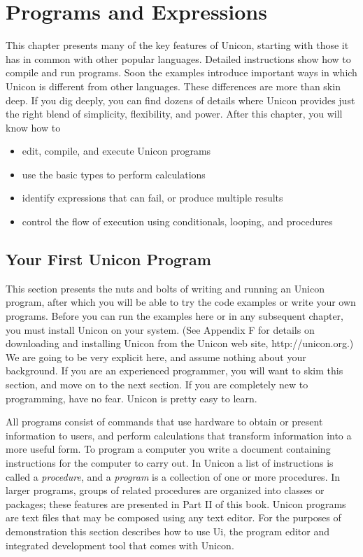 \chapter{Programs and Expressions}

This chapter presents many of the key features of Unicon, starting
with those it has in common with other popular languages. Detailed
instructions show how to compile and run
programs. Soon the examples introduce important ways in which Unicon
is different from other languages. These differences are more than
skin deep. If you dig deeply, you can find dozens of details where
Unicon provides just the right blend of simplicity, flexibility, and
power.  After this chapter, you will know how to
\begin{itemize}\itemsep0pt
  \item edit, compile, and execute Unicon programs
  \item use the basic types to perform calculations
  \item identify expressions that can fail, or
    produce multiple results
  \item control the flow of execution using conditionals, looping, and
    procedures
\end{itemize}

\section{Your First Unicon Program}

This section presents the nuts and bolts of writing and running an
Unicon program, after which you will be able to try
the code examples or write your own programs. Before you can run the
examples here or in any subsequent chapter, you must
install Unicon on your system. (See Appendix F for
details on downloading and installing Unicon from the Unicon web site,
http://unicon.org.) We are going to be very explicit here,
and assume nothing about your background. If you are an experienced
programmer, you will want to skim this section, and move on to the next
section. If you are completely new to programming, have no fear. Unicon
is pretty easy to learn.

All programs consist of commands that use hardware to obtain or present
information to users, and perform calculations that transform
information into a more useful form. To program a
computer you write a document containing instructions for the computer
to carry out. In Unicon a list of instructions is called
a \textit{procedure}, and a
\textit{program} is a collection of one or more
procedures. In larger programs, groups of related procedures are
organized into classes or packages; these features are presented in
Part II of this book. Unicon programs are text files that may be
composed using any text editor. For the purposes of
demonstration this section describes how to use Ui, the
program editor and integrated development tool that comes with Unicon.

